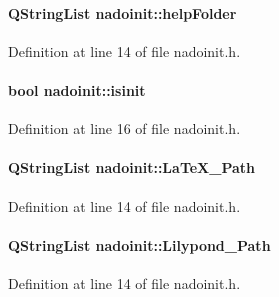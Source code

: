 \hypertarget{classnadoinit_a6fd6457d2be15bfa6c13f0d8deba6a08}{
\paragraph[{help\-Folder}]{\setlength{\rightskip}{0pt plus 5cm}\-Q\-String\-List {\bf nadoinit\-::help\-Folder}}}\label{classnadoinit_a6fd6457d2be15bfa6c13f0d8deba6a08}


\-Definition at line 14 of file nadoinit.\-h.

\hypertarget{classnadoinit_ac5ebbf07fa035e4dffa8d387ddb22fb7}{
\paragraph[{isinit}]{\setlength{\rightskip}{0pt plus 5cm}bool {\bf nadoinit\-::isinit}}}\label{classnadoinit_ac5ebbf07fa035e4dffa8d387ddb22fb7}


\-Definition at line 16 of file nadoinit.\-h.

\hypertarget{classnadoinit_a69347b16c4be15c8923a6d8785d7af9f}{
\paragraph[{\-La\-Te\-X\-\_\-\-Path}]{\setlength{\rightskip}{0pt plus 5cm}\-Q\-String\-List {\bf nadoinit\-::\-La\-Te\-X\-\_\-\-Path}}}\label{classnadoinit_a69347b16c4be15c8923a6d8785d7af9f}


\-Definition at line 14 of file nadoinit.\-h.

\hypertarget{classnadoinit_a9971fc91456e4cf24927c42471c32e64}{
\paragraph[{\-Lilypond\-\_\-\-Path}]{\setlength{\rightskip}{0pt plus 5cm}\-Q\-String\-List {\bf nadoinit\-::\-Lilypond\-\_\-\-Path}}}\label{classnadoinit_a9971fc91456e4cf24927c42471c32e64}


\-Definition at line 14 of file nadoinit.\-h.

